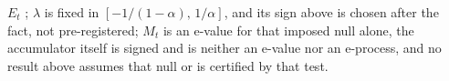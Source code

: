$E_t$ \citep{shafer2019gtfpf,ramdas2023savi,vovk2021evalues}; $\lambda$ is fixed in
$[-1/(1-\alpha),\,1/\alpha]$, and its sign above is chosen after the fact, not pre-registered;
$M_t$ is an e-value for that imposed
null alone, the accumulator itself is signed and is neither an e-value nor an e-process, and no
result above assumes that null or is certified by that test.
%
%
